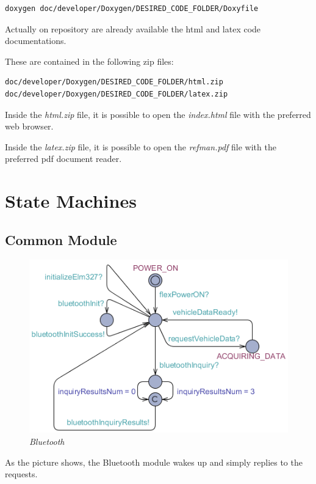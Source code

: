 \documentclass[paper=a4, fontsize=11pt]{scrartcl} %
\numberwithin{equation}{section} %
\numberwithin{figure}{section} %
\numberwithin{table}{section} %
\begin{document}
\begin{lstlisting}[language=bash]
doxygen doc/developer/Doxygen/DESIRED_CODE_FOLDER/Doxyfile
\end{lstlisting}

Actually on repository are already available the html and latex code documentations.

These are contained in the following zip files:

\begin{lstlisting}[language=bash]
doc/developer/Doxygen/DESIRED_CODE_FOLDER/html.zip
doc/developer/Doxygen/DESIRED_CODE_FOLDER/latex.zip
\end{lstlisting}

Inside the \emph{html.zip} file, it is possible to open the \emph{index.html} file with the preferred web browser.

Inside the \emph{latex.zip} file, it is possible to open the \emph{refman.pdf} file with the preferred pdf document reader.

\section{State Machines}

\subsection{Common Module}

\begin{figure}[H]
  \centering
  \includegraphics[width=4.7in]{img/FLEX-OBD-LCD_bluetooth}
  \caption{\textit{Bluetooth}}
\end{figure}

As the picture shows, the Bluetooth module wakes up and simply replies to the requests.
\end{document}
